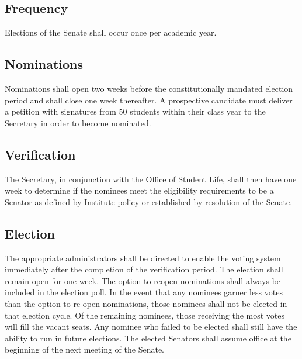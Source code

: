 \documentclass[12pt]{scrreprt}
\begin{document}
\subsection{Frequency}
Elections of the Senate shall occur once per academic year. 

\subsection{Nominations}
Nominations shall open two weeks before the constitutionally mandated election 
period and shall close one week thereafter. A prospective candidate must 
deliver a petition with signatures from 50 students within their class year to 
the Secretary in order to become nominated.

\subsection{Verification} \label{sec:election_verification}
The Secretary, in conjunction with the Office of Student Life, shall then have 
one week to determine if the nominees meet the eligibility requirements to be 
a Senator as defined by Institute policy or established by resolution of the 
Senate. 

\subsection{Election}
The appropriate administrators shall be directed to enable the voting system 
immediately after the completion of the verification period. The election 
shall remain open for one week. The option to reopen nominations shall always be included in the election poll. In the event that any nominees garner less votes than the option to re-open nominations, those nominees shall not be elected in that election cycle. Of the remaining nominees, those receiving the most votes will fill the vacant seats. Any nominee who failed to be elected shall still have the ability to run in future elections. The elected Senators shall assume office at the beginning of the next meeting of the Senate.
\end{document}
